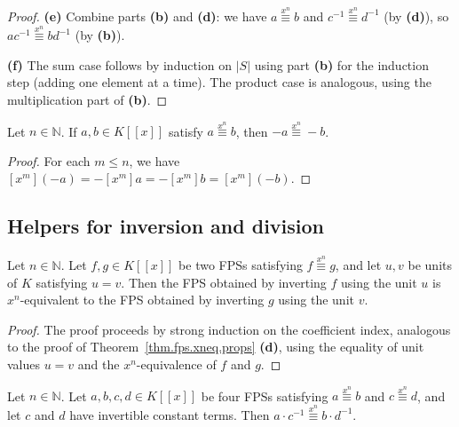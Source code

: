 \begin{proof}
\textbf{(e)} Combine parts \textbf{(b)} and \textbf{(d)}: we have
$a\overset{x^{n}}{\equiv}b$ and $c^{-1}\overset{x^{n}}{\equiv}d^{-1}$ (by
\textbf{(d)}), so $ac^{-1}\overset{x^{n}}{\equiv}bd^{-1}$ (by \textbf{(b)}).

\textbf{(f)} The sum case follows by induction on $|S|$ using part
\textbf{(b)} for the induction step (adding one element at a time). The
product case is analogous, using the multiplication part of \textbf{(b)}.
\end{proof}

\begin{lemma}
\label{lem.fps.xneq.neg}
\leanhelper
\leanok
Let $n\in\mathbb{N}$. If $a,b\in K[[x]]$ satisfy $a\overset{x^{n}}{\equiv}b$,
then $-a\overset{x^{n}}{\equiv}-b$.
\end{lemma}

\begin{proof}
\leanok
For each $m\leq n$, we have
$[x^m](-a)=-[x^m]a=-[x^m]b=[x^m](-b)$.
\end{proof}

\subsection{Helpers for inversion and division}

\begin{lemma}
\label{lem.fps.xneq.invOfUnit-prime}
\leanhelper
\leanok
Let $n\in\mathbb{N}$. Let $f,g\in K[[x]]$ be two FPSs satisfying
$f\overset{x^{n}}{\equiv}g$, and let $u,v$ be units of $K$ satisfying
$u = v$. Then the FPS obtained by inverting $f$ using the unit $u$
is $x^n$-equivalent to the FPS obtained by inverting $g$ using the unit $v$.
\end{lemma}

\begin{proof}
\leanok
The proof proceeds by strong induction on the coefficient index, analogous
to the proof of Theorem~\ref{thm.fps.xneq.props} \textbf{(d)}, using
the equality of unit values $u=v$ and the $x^n$-equivalence of $f$ and $g$.
\end{proof}

\begin{lemma}
\label{lem.fps.xneq.div}
\leanhelper
\leanok
Let $n\in\mathbb{N}$. Let $a,b,c,d\in K[[x]]$ be four FPSs satisfying
$a\overset{x^{n}}{\equiv}b$ and $c\overset{x^{n}}{\equiv}d$,
and let $c$ and $d$ have invertible constant terms. Then
$a \cdot c^{-1}\overset{x^{n}}{\equiv}b \cdot d^{-1}$.
\end{lemma}

